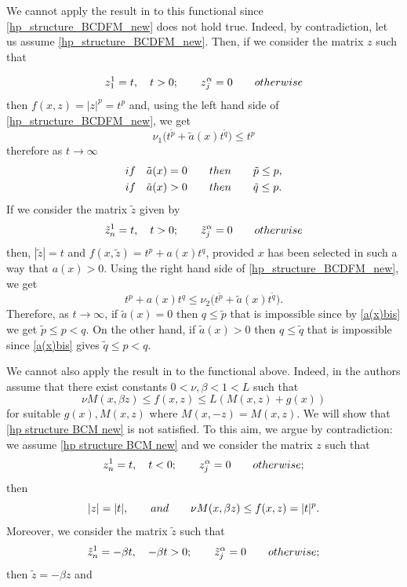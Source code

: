 \documentclass[a4paper,10pt]{article}
\theoremstyle{plain}
\theoremstyle{definition}
\numberwithin{equation}{section} \makeatletter
\begin{document}
\noindent We cannot apply the result in \cite{BCDFM} to this functional since \eqref{hp_structure_BCDFM_new} does not hold true. Indeed, by contradiction, let us assume \eqref{hp_structure_BCDFM_new}. Then, if we consider the matrix $z$ such that

\[
z_1^1=t, \quad t>0; \qquad z_j^{\alpha}=0 \qquad {\rm otherwise}
\]
then $f(x,z)=|z|^p=t^p$ and, using the left hand side of \eqref{hp_structure_BCDFM_new}, we get
\[
\nu_1\bigg( t^{\tilde{p}}+ \tilde{a}(x)t^{\tilde{q}}\bigg) \le  t^p
\]
therefore as $t \rightarrow \infty$
\begin{align}\label{a(x)bis}
{\rm if }  \quad  \tilde{a}(x)=0&  \qquad {\rm then}  \qquad \tilde{p} \le p,\notag\\
{\rm if} \quad \tilde{a}(x)>0 & \qquad  {\rm then}  \qquad \tilde{q} \le p.
\end{align}
If we consider the matrix $\tilde{z}$ given by
\[
\tilde{z}_n^1=t, \quad t>0; \qquad \tilde{z}_j^{\alpha}=0 \qquad {\rm otherwise}
\]
then, $|\tilde{z}|=t$ and $f(x, \tilde{z})= t^p+ a(x)t^q$, provided 
$x$ has been selected in such a way that $a(x)>0$. Using the right hand side of \eqref{hp_structure_BCDFM_new}, we get
\[
t^p+ a(x)t^q \le \nu_2\bigg( t^{\tilde{p}}+ \tilde{a}(x)t^{\tilde{q}}\bigg).
\]
Therefore, as $t \rightarrow \infty$, if $\tilde{a}(x)=0$  then $ q \le \tilde{p}$ that is impossible since by \eqref{a(x)bis} we get $\tilde{p} \le p< q$. On the other hand, 
if $\tilde{a}(x)>0$ then $q \le \tilde{q}$ that is impossible since \eqref{a(x)bis} gives $\tilde{q} \le p< q$.

\vspace{0.2 cm}
\noindent We cannot also apply the result in \cite{BCM} to the  functional above. Indeed, in \cite{BCM} the authors assume that there exist constants $0<\nu, \beta <1 <L$ such that
\begin{equation}\label{hp structure BCM new}
 \nu M(x,\beta z)\le f(x,z) \le L(M(x,z)+ g(x))
\end{equation}
for suitable $g(x), M(x,z)$ where $M(x,-z)=M(x,z)$. We will show that \eqref{hp structure BCM new}
is not satisfied.
To this aim, we argue by contradiction: we assume  \eqref{hp structure BCM new}  and we consider the matrix $z$ such that
\[
z_n^1=t, \quad t<0; \qquad z_j^{\alpha}=0 \qquad {\rm otherwise;}
\]
then
\[
|z|=|t|, \qquad {\rm and} \qquad \nu M(x,\beta z)\le f(x,z)=|t|^p.
\]
Moreover, we consider the matrix $\tilde{z}$ such that 
\[
\tilde{z}_n^1=- \beta t, \quad - \beta t>0; \qquad \tilde{z}_j^{\alpha}=0 \qquad {\rm otherwise;}
\]
then $\tilde{z}=- \beta z$ and
\end{document}
